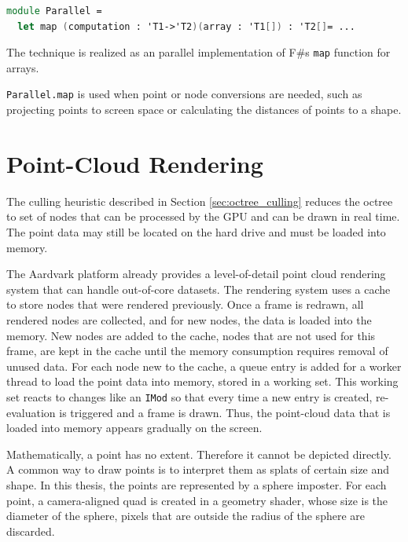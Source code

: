 \begin{lstlisting}[language = FSharp]
module Parallel = 
  let map (computation : 'T1->'T2)(array : 'T1[]) : 'T2[]= ...
\end{lstlisting}
The technique is realized as an parallel implementation of F\#s \verb|map| function for arrays. 

\verb|Parallel.map| is used when point or node conversions are needed, such as projecting points to screen space or calculating the distances of points to a shape. 


\section{Point-Cloud Rendering}
\label{sec:rendering}

The culling heuristic described in Section \ref{sec:octree_culling} reduces the octree to set of nodes that can be processed by the GPU and can be drawn in real time. The point data may still be located on the hard drive and must be loaded into memory. 

\par

The Aardvark platform already provides a level-of-detail point cloud rendering system that can handle out-of-core datasets. The rendering system uses a cache to store nodes that were rendered previously. Once a frame is redrawn, all rendered nodes are collected, and for new nodes, the data is loaded into the memory. New nodes are added to the cache, nodes that are not used for this frame, are kept in the cache until the memory consumption requires removal of unused data. For each node new to the cache, a queue entry is added for a worker thread to load the point data into memory, stored in a working set. This working set reacts to changes like an \verb|IMod| so that every time a new entry is created, re-evaluation is triggered and a frame is drawn. Thus, the point-cloud data that is loaded into memory appears gradually on the screen. 

\par

Mathematically, a point has no extent. Therefore it cannot be depicted directly. A common way to draw points is to interpret them as splats of certain size and shape. In this thesis, the points are represented by a sphere imposter. For each point, a camera-aligned quad is created in a geometry shader, whose size is the diameter of the sphere, pixels that are outside the radius of the sphere are discarded. 


